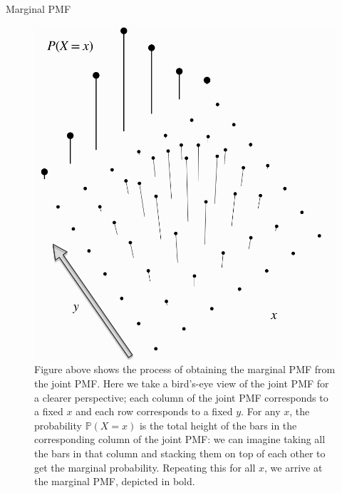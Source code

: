 \documentclass[8pt, usepdftitle=false]{beamer}
\begin{document}
\begin{frame}{Marginal PMF}
\begin{figure}
  \includegraphics[scale = .25]{Images/marginal_PMF.png}
    \caption{Figure above shows the process of obtaining the marginal PMF from the joint PMF. Here we take a bird's-eye view of the joint PMF for a clearer perspective; each column of the joint PMF corresponds to a fixed $x$ and each row corresponds to a fixed $y$. For any $x$, the probability $\mathbb{P}(X=x)$ is the total height of the bars in the corresponding column of the joint PMF: we can imagine taking all the bars in that column and stacking them on top of each other to get the marginal probability. Repeating this for all $x$, we arrive at the marginal PMF, depicted in bold.}
\end{figure}

\end{frame}
\end{document}
